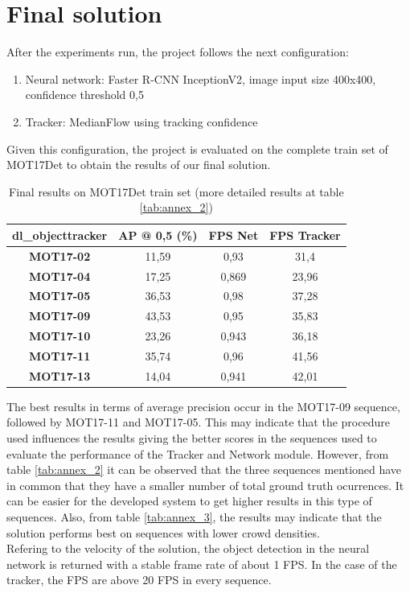 \section{Final solution}\label{final_sol}
After the experiments run, the project follows the next configuration:
\begin{enumerate}
    \item Neural network: Faster R-CNN InceptionV2, image input size 400x400, confidence threshold 0,5
    \item Tracker: MedianFlow using tracking confidence
\end{enumerate}
Given this configuration, the project is evaluated on the complete train set of MOT17Det to obtain the results of our final solution.
\begin{table}[H]
\begin{center}
\begin{tabular}{|c|c|c|c|}
\hline
\textbf{dl\_objecttracker} & \textbf{AP @ 0,5 (\%)} & \textbf{FPS Net} & \multicolumn{1}{l|}{\textbf{FPS Tracker}} \\ \hline
\textbf{MOT17-02}          & 11,59                  & 0,93             & 31,4                                      \\ \hline
\textbf{MOT17-04}          & 17,25                  & 0,869            & 23,96                                     \\ \hline
\textbf{MOT17-05}          & 36,53                  & 0,98             & 37,28                                     \\ \hline
\textbf{MOT17-09}          & 43,53                  & 0,95             & 35,83                                     \\ \hline
\textbf{MOT17-10}          & 23,26                  & 0,943            & 36,18                                     \\ \hline
\textbf{MOT17-11}          & 35,74                  & 0,96             & 41,56                                     \\ \hline
\textbf{MOT17-13}          & 14,04                  & 0,941            & 42,01                                     \\ \hline
\end{tabular}
\end{center}
\caption{Final results on MOT17Det train set (more detailed results at table \ref{tab:annex_2})}
\label{tab:final}
\end{table}
The best results in terms of average precision occur in the MOT17-09 sequence, followed by MOT17-11 and MOT17-05. This may indicate that the procedure used influences the results giving the better scores in the sequences used to evaluate the performance of the Tracker and Network module. However, from table \ref{tab:annex_2} it can be observed that the three sequences mentioned have in common that they have a smaller number of total ground truth ocurrences. It can be easier for the developed system to get higher results in this type of sequences. Also, from table \ref{tab:annex_3}, the results may indicate that the solution performs best on sequences with lower crowd densities.\\
Refering to the velocity of the solution, the object detection in the neural network is returned with a stable frame rate of about 1 FPS. In the case of the tracker, the FPS are above 20 FPS in every sequence.